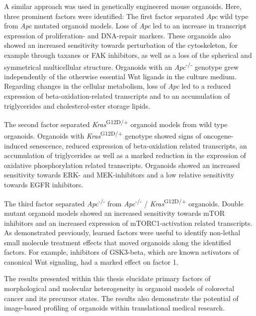 A similar approach was used in genetically engineered mouse organoids. Here, three prominent factors were identified: The first factor separated \textit{Apc} wild type from \textit{Apc} mutated organoid models. Loss of \textit{Apc} led to an increase in transcript expression of proliferation- and DNA-repair markers. These organoids also showed an increased sensitivity towards perturbation of the cytoskeleton, for example through taxanes or FAK inhibitors, as well as a loss of the spherical and symmetrical multicellular structure. Organoids with an \textit{Apc}\textsuperscript{-/-} genotype grew independently of the otherwise essential Wnt ligands in the culture medium. Regarding changes in the cellular metabolism, loss of \textit{Apc} led to a reduced expression of beta-oxidation-related transcripts and to an accumulation of triglycerides and cholesterol-ester storage lipids.
\bigbreak

The second factor separated \textit{Kras}\textsuperscript{G12D/+} organoid models from wild type organoids. Organoids with \textit{Kras}\textsuperscript{G12D/+} genotype showed signs of oncogene-induced senescence, reduced expression of beta-oxidation related transcripts, an accumulation of triglycerides as well as a marked reduction in the expression of oxidative phosphorylation related transcripts. Organoids showed an increased sensitivity towards ERK- and MEK-inhibitors and a low relative sensitivity towards EGFR inhibitors. 
\bigbreak

The third factor separated \textit{Apc}\textsuperscript{-/-} from \textit{Apc}\textsuperscript{-/-} / \textit{Kras}\textsuperscript{G12D/+} organoids. Double mutant organoid models showed an increased sensitivity towards mTOR inhibitors and an increased expression of mTORC1-activation related transcripts. As demonstrated previously, learned factors were useful to identify non-lethal small molecule treatment effects that moved organoids along the identified factors. For example, inhibitors of GSK3-beta, which are known activators of canonical Wnt signaling, had a marked effect on factor 1. 
\bigbreak

The results presented within this thesis elucidate primary factors of morphological and molecular heterogeneity in organoid models of colorectal cancer and its precursor states. The results also demonstrate the potential of image-based profiling of organoids within translational medical research. 
